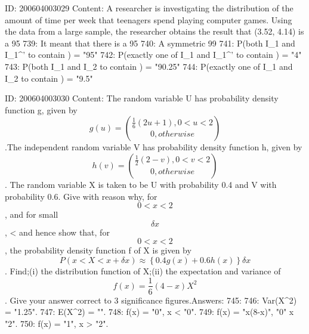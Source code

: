 \documentclass{article}
\begin{document}
ID: 200604003029
Content:
A researcher is investigating the distribution of the amount of time per week that teenagers spend playing computer games. Using the data from a large sample, the researcher obtains the result that (3.52, 4.14) is a 95%
739: It meant that there is a 95%
740: A symmetric 99%
741: P(both I_1 and {I_1}^' to contain \mu) = "95"%
742: P(exactly one of I_1 and {I_1}^' to contain \mu) = "4"%
743:  P(both I_1 and I_2 to contain \mu) = "90.25"%
744:  P(exactly one of I_1 and I_2 to contain \mu) = "9.5"%

ID: 200604003030
Content:
The random variable U has probability density function g, given by $$g \left(u\right) = \binom{\frac{1}{6}\left(2u + 1\right),  0 < u < 2}  {0, otherwise} $$.The independent random variable V has probability density function h, given by $$h\left(v\right) = \binom{\frac{1}{2}\left(2 - v\right), 0 < v < 2}{0, otherwise}$$. The random variable X is taken to be U with probability 0.4 and V with probability 0.6. Give with reason why, for $$0 < x < 2$$, and for small $$\delta x$$, <  and hence show that, for $$0 < x < 2$$, the probability density function f of X is given by $$P\left(x < X < x + \delta x \right) \approx \left\{0.4g\left(x\right) + 0.6h\left(x\right)\right\}\delta x$$. Find;(i) the distribution function of X;(ii) the expectation and variance of  $$f\left(x\right) = \frac{1}{6}\left(4 - x\right) X^2$$ . Give your answer correct to 3 significance figures.Answers:
745: 
746: Var(X^2) = "1.25".
747: E(X^2)  = "".
748: f(x) = "0",  x < "0".
749: f(x) = "x(8-x)", "0" \leq x \leq  "2".
750: f(x) = "1", x > "2".
\end{document}
